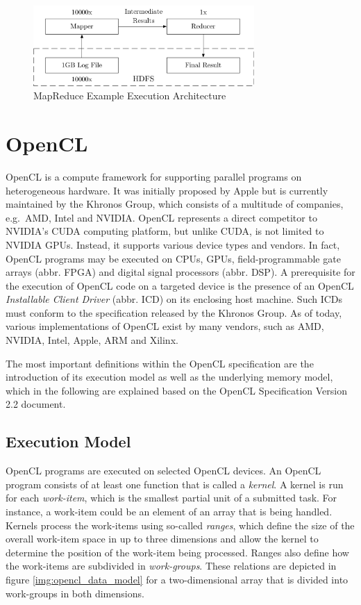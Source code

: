 \begin{figure}[!htb]
	\includegraphics[width=0.75\textwidth]{drawings/mapreduce_arch.pdf}
	\centering
	\caption{MapReduce Example Execution Architecture}
	\label{img:mapreduce_arch}
\end{figure}

\section{OpenCL}
\label{opencl}
OpenCL is a compute framework for supporting parallel programs on heterogeneous hardware. It was initially proposed by Apple but is currently maintained by the Khronos Group, which consists of a multitude of companies, e.g.~AMD, Intel and NVIDIA\cite{opencl_directors}. OpenCL represents a direct competitor to NVIDIA's CUDA computing platform, but unlike CUDA, is not limited to NVIDIA GPUs. Instead, it supports various device types and vendors. In fact, OpenCL programs may be executed on CPUs, GPUs, field-programmable gate arrays (abbr. FPGA) and digital signal processors (abbr. DSP). A prerequisite for the execution of OpenCL code on a targeted device is the presence of an OpenCL \textit{Installable Client Driver} (abbr. ICD) on its enclosing host machine. Such ICDs must conform to the specification released by the Khronos Group. As of today, various implementations of OpenCL exist by many vendors, such as AMD, NVIDIA, Intel, Apple, ARM and Xilinx\cite{opencl_conform}.

The most important definitions within the OpenCL specification are the introduction of its execution model as well as the underlying memory model, which in the following are explained based on the OpenCL Specification Version 2.2 document\cite{opencl_spec}.

\subsection*{Execution Model}
OpenCL programs are executed on selected OpenCL devices. An OpenCL program consists of at least one function that is called a \textit{kernel}. A kernel is run for each \textit{work-item}, which is the smallest partial unit of a submitted task. For instance, a work-item could be an element of an array that is being handled. Kernels process the work-items using so-called \textit{ranges}, which define the size of the overall work-item space in up to three dimensions and allow the kernel to determine the position of the work-item being processed. Ranges also define how the work-items are subdivided in \textit{work-groups}. These relations are depicted in figure \ref{img:opencl_data_model} for a two-dimensional array that is divided into work-groups in both dimensions.

